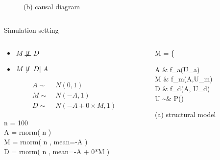 \begin{frame}
\begin{columns}
\begin{column}{0.5\textwidth}
\begin{figure}
				\caption*{(b) causal diagram}
			\end{figure}
		\end{column}
	\end{columns}
\end{frame}
%
%
\begin{frame}
	{Simulation setting}
	\begin{columns}
		\begin{column}{0.5\textwidth}
			\begin{itemize}
				\item $M \not\!\perp\!\!\!\perp D$
				\item $M \not\!\perp\!\!\!\perp D | \; A$
			\end{itemize}
			\begin{align*}
				A \sim & \; N(0, 1) \\
				M \sim & \; N(-A, 1) \\
				D \sim & \; N(-A + 0 \times M, 1)
			\end{align*}
			
			\begin{codesnippet}[\textwidth]
				n = 100 \\
				A = rnorm( n ) \\
				M = rnorm( n , mean=-A ) \\
				D = rnorm( n , mean=-A + 0*M ) 
			\end{codesnippet}
		\end{column}
		\begin{column}{0.5\textwidth}  
			\begin{equ}
				M = \left\{ \begin{aligned} 
					A \leftarrow & \; f_{a}(U_{a}) \\
					M \leftarrow & \; f_{m}(A,U_{m}) \\
					D \leftarrow & \; f_{d}(A, U_{d}) \\
					U \sim & \; P()
				\end{aligned} \right
				\caption*{(a) structural model}
			\end{equ}
			\begin{figure}
\end{figure}
\end{column}
\end{columns}
\end{frame}
